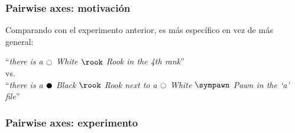 \begin{frame}
\frametitle{Pairwise axes: motivación}
Comparando con el experimento anterior, es más específico en vez de más general:
\begin{center}
\enquote{\textit{there is a $\white$ White $\rook$ Rook in the 4th rank}} \\
vs. \\
\enquote{\textit{there is a $\black$ Black $\rook$ Rook next to a $\white$ White $\sympawn$ Pawn in the \enquote{a} file}}
\end{center}
\end{frame}

\begin{frame}
\frametitle{Pairwise axes: experimento}
\begin{figure}[h]
\centering
\begin{adjustbox}{max width=\textwidth}
\begin{tabular}{cc}


\end{tabular}
\end{adjustbox}
\end{figure}
\end{frame}
